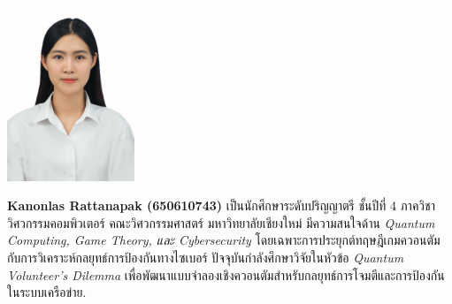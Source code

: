 \documentclass[semifinal]{cpecmu}
\author{นางสาวกนลลัส รัตนภาค}{Kanonlas Rattanapak}{650610743}
\author{นางสาวแก้วตา ลุงต๊ะ}{Kaewtar Lungta}{650610750}
\author{นายธีระพันธุ์ พันธุ์วรรธนะสิน}{Theeraphan Phanwattanasin}{650610773}
\begin{document}


\pagestyle{empty}\cleardoublepage
\normalspacing \setcounter{page}{1}  \pagestyle{cpecmu}





\ifproject

\fi



\ifproject
\normalspacing
\appendix


\ifglossary\glossarypage\fi

\ifindex\indexpage\fi

\begin{biosketch}
\begin{center}
  \includegraphics[width=1.5in]{0743.jpeg}
\end{center}
\textbf{Kanonlas Rattanapak (650610743)} เป็นนักศึกษาระดับปริญญาตรี ชั้นปีที่ 4 
ภาควิชาวิศวกรรมคอมพิวเตอร์ คณะวิศวกรรมศาสตร์ มหาวิทยาลัยเชียงใหม่
มีความสนใจด้าน \textit{Quantum Computing, Game Theory, และ Cybersecurity}
โดยเฉพาะการประยุกต์ทฤษฎีเกมควอนตัมกับการวิเคราะห์กลยุทธ์การป้องกันทางไซเบอร์
ปัจจุบันกำลังศึกษาวิจัยในหัวข้อ \textit{Quantum Volunteer's Dilemma}
เพื่อพัฒนาแบบจำลองเชิงควอนตัมสำหรับกลยุทธ์การโจมตีและการป้องกันในระบบเครือข่าย.


\end{biosketch}
\fi %
\end{document}
